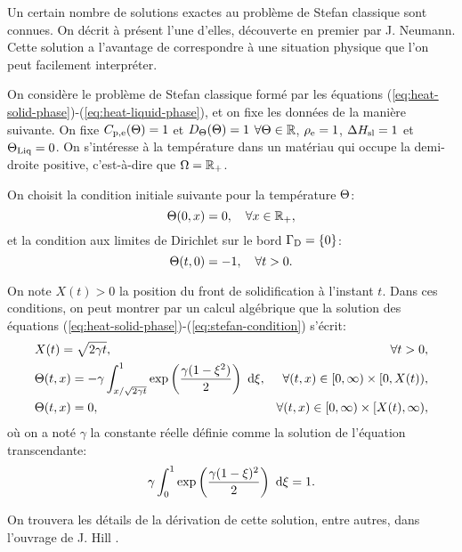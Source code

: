 Un certain nombre de solutions exactes au problème de Stefan
classique sont connues. On décrit à présent l'une d'elles, découverte en
premier par J. Neumann. Cette solution a l'avantage de correspondre à
une situation physique que l'on peut facilement interpréter.

On considère le problème de Stefan classique formé par les équations
(\ref{eq:heat-solid-phase})-(\ref{eq:heat-liquid-phase}), et on fixe
les données de la manière suivante. On fixe
$C_{\mathrm{p,e}}(\Theta) = 1$ et
$D_\Theta(\Theta)=1$ $\forall\Theta \in \mathbb
R$, $\rho_\mathrm{e} = 1$, $\Delta H_\mathrm{sl} = 1$ et $\Theta_\text{Liq} =
0$. On s'intéresse à la température dans un matériau qui occupe la
demi-droite positive, c'est-à-dire que $\Omega = \mathbb R_+$.

On choisit la condition initiale suivante pour la température
$\Theta$:
\begin{equation}
  \Theta(0, x) = 0, \quad \forall x\in\mathbb R_+,
\end{equation}
et la condition aux limites de Dirichlet sur le bord $\Gamma_\mathrm{D} =
\left\{ 0 \right\}$:
\begin{equation}
  \Theta(t, 0) = -1, \quad \forall t > 0.
\end{equation}

On note $X(t) > 0$ la position du front de solidification à l'instant
$t$. Dans ces conditions, on peut montrer \cite{HillStefanProblems}
par un calcul algébrique que la solution des équations
(\ref{eq:heat-solid-phase})-(\ref{eq:stefan-condition}) s'écrit:
\begin{align}
  & X(t) = \sqrt{2\gamma t},& \forall t > 0,\label{eq:neumann-sol-frontier}\\
  & \temperature(t, x) = -\gamma\int_{x / \sqrt{2\gamma
      t}}^1\exp\parent{\frac{\gamma(1 - \xi^2)}{2}}\, \intd{\xi},%
  & \forall (t, x) \in [0,\infty)\times[0,X(t)),\label{eq:neumann-sol-solid-phase}\\
    & \temperature(t, x) = 0,
    & \forall (t, x) \in [0,\infty)\times[X(t), \infty),\label{eq:neumann-sol-liquid-phase}
\end{align}
où on a noté $\gamma$ la constante réelle définie comme la solution de
l'équation transcendante:
\begin{equation}
  \gamma \int_0^1\exp\left( \frac{\gamma(1 - \xi)^2}{2} \right)\,\,\mathrm d\xi
  = 1.
\end{equation}

On trouvera les détails de la dérivation de cette solution, entre
autres, dans l'ouvrage de J. Hill \cite{HillStefanProblems}.

